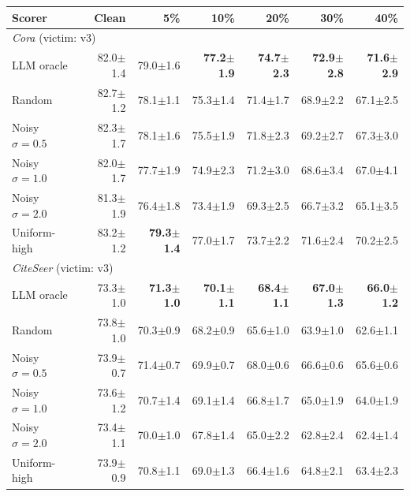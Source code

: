 \documentclass{article}
\newcommand{\score}[2]{#1{\scriptsize$\pm$#2}}
\begin{document}
\begin{center}
\scriptsize
\begin{tabular}{lrrrrrr}
\toprule
Scorer & Clean & 5\% & 10\% & 20\% & 30\% & 40\% \\
\midrule
\multicolumn{7}{l}{\textit{Cora} (victim: v3)} \\
\midrule
LLM oracle           & \score{82.0}{1.4} & \score{79.0}{1.6} & \textbf{\score{77.2}{1.9}} & \textbf{\score{74.7}{2.3}} & \textbf{\score{72.9}{2.8}} & \textbf{\score{71.6}{2.9}} \\
Random               & \score{82.7}{1.2} & \score{78.1}{1.1} & \score{75.3}{1.4} & \score{71.4}{1.7} & \score{68.9}{2.2} & \score{67.1}{2.5} \\
Noisy $\sigma{=}0.5$ & \score{82.3}{1.7} & \score{78.1}{1.6} & \score{75.5}{1.9} & \score{71.8}{2.3} & \score{69.2}{2.7} & \score{67.3}{3.0} \\
Noisy $\sigma{=}1.0$ & \score{82.0}{1.7} & \score{77.7}{1.9} & \score{74.9}{2.3} & \score{71.2}{3.0} & \score{68.6}{3.4} & \score{67.0}{4.1} \\
Noisy $\sigma{=}2.0$ & \score{81.3}{1.9} & \score{76.4}{1.8} & \score{73.4}{1.9} & \score{69.3}{2.5} & \score{66.7}{3.2} & \score{65.1}{3.5} \\
Uniform-high         & \score{83.2}{1.2} & \textbf{\score{79.3}{1.4}} & \score{77.0}{1.7} & \score{73.7}{2.2} & \score{71.6}{2.4} & \score{70.2}{2.5} \\
\midrule
\multicolumn{7}{l}{\textit{CiteSeer} (victim: v3)} \\
\midrule
LLM oracle           & \score{73.3}{1.0} & \textbf{\score{71.3}{1.0}} & \textbf{\score{70.1}{1.1}} & \textbf{\score{68.4}{1.1}} & \textbf{\score{67.0}{1.3}} & \textbf{\score{66.0}{1.2}} \\
Random               & \score{73.8}{1.0} & \score{70.3}{0.9} & \score{68.2}{0.9} & \score{65.6}{1.0} & \score{63.9}{1.0} & \score{62.6}{1.1} \\
Noisy $\sigma{=}0.5$ & \score{73.9}{0.7} & \score{71.4}{0.7} & \score{69.9}{0.7} & \score{68.0}{0.6} & \score{66.6}{0.6} & \score{65.6}{0.6} \\
Noisy $\sigma{=}1.0$ & \score{73.6}{1.2} & \score{70.7}{1.4} & \score{69.1}{1.4} & \score{66.8}{1.7} & \score{65.0}{1.9} & \score{64.0}{1.9} \\
Noisy $\sigma{=}2.0$ & \score{73.4}{1.1} & \score{70.0}{1.0} & \score{67.8}{1.4} & \score{65.0}{2.2} & \score{62.8}{2.4} & \score{62.4}{1.4} \\
Uniform-high         & \score{73.9}{0.9} & \score{70.8}{1.1} & \score{69.0}{1.3} & \score{66.4}{1.6} & \score{64.8}{2.1} & \score{63.4}{2.3} \\

\end{tabular}
\end{center}
\end{document}
